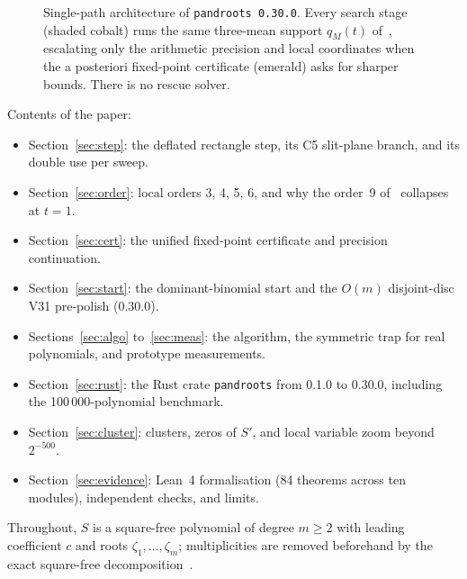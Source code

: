 \documentclass[10pt,a4paper]{article}
\theoremstyle{definition}
\numberwithin{equation}{section}
\begin{document}
\begin{figure}[!htbp]
{%
}
\caption{Single-path architecture of \texttt{pandroots 0.30.0}. Every search stage (shaded cobalt) runs the same three-mean support $q_M(t)$ of~\cite{v31,c5}, escalating only the arithmetic precision and local coordinates when the a posteriori fixed-point certificate (emerald) asks for sharper bounds. There is no rescue solver.}\label{fig:arch}
\end{figure}

Contents of the paper:
\begin{itemize}
\item Section~\ref{sec:step}: the deflated rectangle step, its C5 slit-plane branch, and its double use per sweep.
\item Section~\ref{sec:order}: local orders 3, 4, 5, 6, and why the order~9 of~\cite{v31} collapses at $t=1$.
\item Section~\ref{sec:cert}: the unified fixed-point certificate and precision continuation.
\item Section~\ref{sec:start}: the dominant-binomial start and the $O(m)$ disjoint-disc V31 pre-polish (0.30.0).
\item Sections~\ref{sec:algo} to~\ref{sec:meas}: the algorithm, the symmetric trap for real polynomials, and prototype measurements.
\item Section~\ref{sec:rust}: the Rust crate \texttt{pandroots} from 0.1.0 to 0.30.0, including the 100\,000-polynomial benchmark.
\item Section~\ref{sec:cluster}: clusters, zeros of $S'$, and local variable zoom beyond $2^{-500}$.
\item Section~\ref{sec:evidence}: Lean~4 formalisation (84 theorems across ten modules), independent checks, and limits.
\end{itemize}
Throughout, $S$ is a square-free polynomial of degree $m\ge2$ with leading coefficient $c$ and roots $\zeta_1,\dots,\zeta_m$; multiplicities are removed beforehand by the exact square-free decomposition~\cite{g5,g6}.
\end{document}
